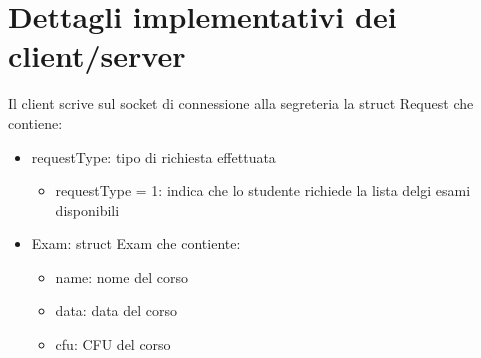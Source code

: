 \documentclass{article}
\begin{document}
\section{Dettagli implementativi dei client/server}
Il client scrive sul socket di connessione alla segreteria la struct Request che contiene:
\begin{itemize}
    \item requestType: tipo di richiesta effettuata
    \begin{itemize}
        \item requestType = 1: indica che lo studente richiede la lista delgi esami disponibili
    \end{itemize}
    \item Exam: struct Exam che contiente:
    \begin{itemize}
        \item name: nome del corso
        \item data: data del corso
        \item cfu: CFU del corso
    \end{itemize}

\end{itemize}
\end{document}
